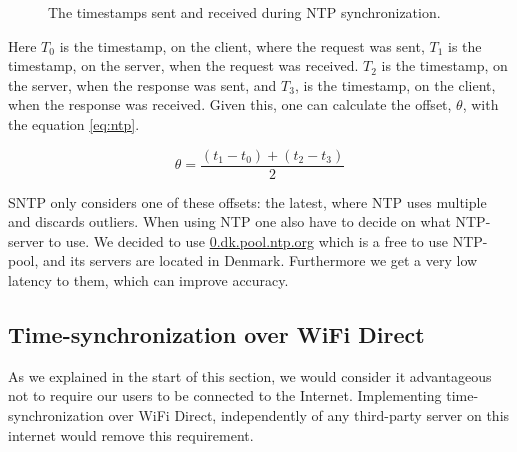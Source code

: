 \begin{figure}[htb]
    \centering
    \caption{The timestamps sent and received during \ac{NTP} synchronization.}
    \label{fig:ntp_packets}
\end{figure}

Here $T_0$ is the timestamp, on the client, where the request was sent, $T_1$ is the timestamp, on the server, when the request was received.
$T_2$ is the timestamp, on the server, when the response was sent, and $T_3$, is the timestamp, on the client, when the response was received.
Given this, one can calculate the offset, $\theta$, with the equation \ref{eq:ntp}.

\begin{equation}\label{eq:ntp}
    \theta = \frac{(t_1 - t_0)+(t_2 - t_3)}{2}
\end{equation}

\ac{SNTP} only considers one of these offsets: the latest, where \ac{NTP} uses multiple and discards outliers.
When using \ac{NTP} one also have to decide on what \ac{NTP}-server to use.
We decided to use \url{0.dk.pool.ntp.org} which is a free to use \ac{NTP}-pool, and its servers are located in Denmark.
Furthermore we get a very low latency to them, which can improve accuracy.

\subsection{Time-synchronization over WiFi Direct}
As we explained in the start of this section, we would consider it advantageous not to require our users to be connected to the Internet.
Implementing time-synchronization over WiFi Direct, independently of any third-party server on this internet would remove this requirement.

